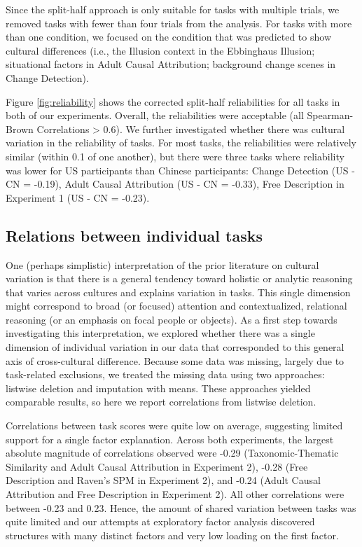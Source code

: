 \documentclass[
  man,floatsintext]{apa6}
\begin{document}
Since the split-half approach is only suitable for tasks with multiple trials, we removed tasks with fewer than four trials from the analysis. For tasks with more than one condition, we focused on the condition that was predicted to show cultural differences (i.e., the Illusion context in the Ebbinghaus Illusion; situational factors in Adult Causal Attribution; background change scenes in Change Detection).

Figure \ref{fig:reliability} shows the corrected split-half reliabilities for all tasks in both of our experiments. Overall, the reliabilities were acceptable (all Spearman-Brown Correlations \textgreater{} 0.6). We further investigated whether there was cultural variation in the reliability of tasks. For most tasks, the reliabilities were relatively similar (within 0.1 of one another), but there were three tasks where reliability was lower for US participants than Chinese participants: Change Detection (US - CN = -0.19), Adult Causal Attribution (US - CN = -0.33), Free Description in Experiment 1 (US - CN = -0.23).

\hypertarget{relations-between-individual-tasks}{%
\subsection{Relations between individual tasks}\label{relations-between-individual-tasks}}

One (perhaps simplistic) interpretation of the prior literature on cultural variation is that there is a general tendency toward holistic or analytic reasoning that varies across cultures and explains variation in tasks. This single dimension might correspond to broad (or focused) attention and contextualized, relational reasoning (or an emphasis on focal people or objects). As a first step towards investigating this interpretation, we explored whether there was a single dimension of individual variation in our data that corresponded to this general axis of cross-cultural difference. Because some data was missing, largely due to task-related exclusions, we treated the missing data using two approaches: listwise deletion and imputation with means. These approaches yielded comparable results, so here we report correlations from listwise deletion.

Correlations between task scores were quite low on average, suggesting limited support for a single factor explanation. Across both experiments, the largest absolute magnitude of correlations observed were -0.29 (Taxonomic-Thematic Similarity and Adult Causal Attribution in Experiment 2), -0.28 (Free Description and Raven's SPM in Experiment 2), and -0.24 (Adult Causal Attribution and Free Description in Experiment 2). All other correlations were between -0.23 and 0.23. Hence, the amount of shared variation between tasks was quite limited and our attempts at exploratory factor analysis discovered structures with many distinct factors and very low loading on the first factor.
\end{document}
